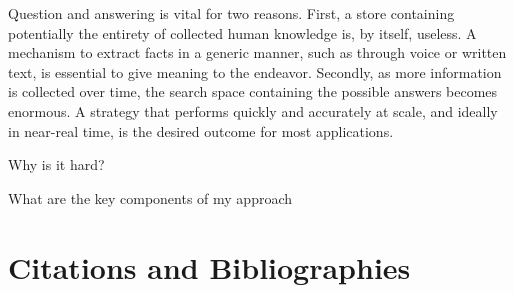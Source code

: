 \documentclass[sigplan,screen]{acmart}
\begin{document}
Question and answering is vital for two reasons. First, a store containing potentially the entirety of collected human knowledge is, by itself, useless. A mechanism to extract facts in a generic manner, such as through voice or written text, is essential to give meaning to the endeavor. Secondly, as more information is collected over time, the search space containing the possible answers becomes enormous. A strategy that performs quickly and accurately at scale, and ideally in near-real time, is the desired outcome for most applications.


Why is it hard?


What are the key components of my approach


\section{Citations and Bibliographies}
\nocite{*}


\end{document}
